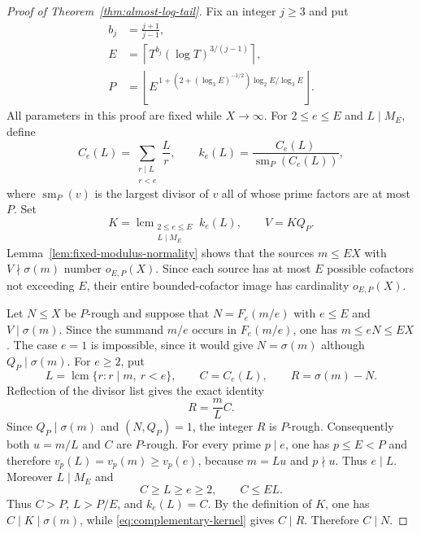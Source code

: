 \documentclass[11pt]{article}
\theoremstyle{remark}
\newcommand{\1}{\mathbf 1}
\DeclareMathOperator{\lcm}{lcm}
\begin{document}
\begin{proof}[Proof of Theorem~\ref{thm:almost-log-tail}]
Fix an integer $j\geq3$ and put
\begin{align*}
 b_j&=\frac{j+1}{j-1},\\
 E&=\left\lceil T^{b_j}(\log T)^{3/(j-1)}\right\rceil,\\
 P&=\left\lfloor
 E^{\,1+(2+(\log_3E)^{-1/2})\log_2E/\log_3E}
 \right\rfloor.
\end{align*}
All parameters in this proof are fixed while $X\to\infty$.  For
$2\leq e\leq E$ and $L\mid M_E$, define
\[
 C_e(L)=\sum_{\substack{r\mid L\\r<e}}\frac Lr,
 \qquad
 k_e(L)=\frac{C_e(L)}{\operatorname{sm}_P(C_e(L))},
\]
where $\operatorname{sm}_P(v)$ is the largest divisor of $v$ all of whose
prime factors are at most $P$.  Set
\[
 K=\lcm_{\substack{2\leq e\leq E\\L\mid M_E}} k_e(L),
 \qquad V=KQ_P.
\]
Lemma~\ref{lem:fixed-modulus-normality} shows that the sources $m\leq EX$
with $V\nmid\sigma(m)$ number $o_{E,P}(X)$.  Since each source has at most
$E$ possible cofactors not exceeding $E$, their entire bounded-cofactor
image has cardinality $o_{E,P}(X)$.

Let $N\leq X$ be $P$-rough and suppose that
$N=F_e(m/e)$ with $e\leq E$ and $V\mid\sigma(m)$.  Since the summand $m/e$
occurs in $F_e(m/e)$, one has $m\leq eN\leq EX$.  The case $e=1$ is
impossible, since it would give $N=\sigma(m)$ although $Q_P\mid\sigma(m)$.
For $e\geq2$, put
\[
 L=\lcm\{r:r\mid m,\ r<e\},
 \qquad C=C_e(L),
 \qquad R=\sigma(m)-N.
\]
Reflection of the divisor list gives the exact identity
\begin{equation}\label{eq:complementary-kernel}
 R=\frac mL C.
\end{equation}
Since $Q_P\mid\sigma(m)$ and $(N,Q_P)=1$, the integer $R$ is $P$-rough.
Consequently both $u=m/L$ and $C$ are $P$-rough.  For every prime $p\mid e$,
one has $p\leq E<P$ and therefore
$v_p(L)=v_p(m)\geq v_p(e)$, because $m=Lu$ and $p\nmid u$.  Thus $e\mid L$.
Moreover $L\mid M_E$ and
\[
 C\geq L\geq e\geq2,
 \qquad C\leq EL.
\]
Thus $C>P$, $L>P/E$, and $k_e(L)=C$.  By the definition of $K$, one has
$C\mid K\mid\sigma(m)$, while \eqref{eq:complementary-kernel} gives
$C\mid R$.  Therefore $C\mid N$.


\end{proof}
\end{document}
